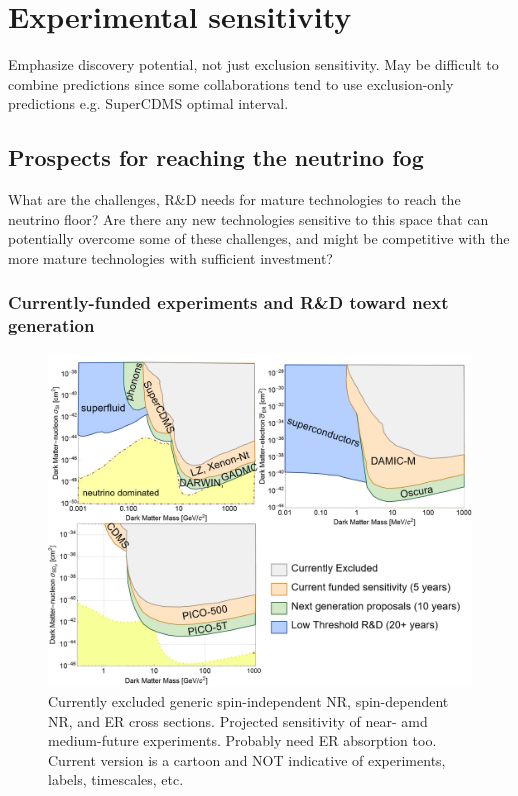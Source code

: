 \section{Experimental sensitivity}
\label{sec:experiment}

Emphasize discovery potential, not just exclusion sensitivity. May be difficult to combine predictions since some collaborations tend to use exclusion-only predictions e.g. SuperCDMS optimal interval. 

\subsection{Prospects for reaching the neutrino fog}
What are the challenges, R\&D needs for mature technologies to reach the neutrino floor?  Are there any new technologies sensitive to this space that can potentially overcome some of these challenges, and might be competitive with the more mature technologies with sufficient investment?
\subsubsection{Currently-funded experiments and R\&D toward next generation}

\begin{figure}
    \centering
    \includegraphics[width=\textwidth]{figures/wimp_sensitivty_cartoon.png}
    \caption{Currently excluded generic spin-independent NR, spin-dependent NR, and ER cross sections. Projected sensitivity of near- amd medium-future experiments. Probably need ER absorption too. Current version is a cartoon and NOT indicative of experiments, labels, timescales, etc.}
    \label{fig:si_sensitivity}
\end{figure}

